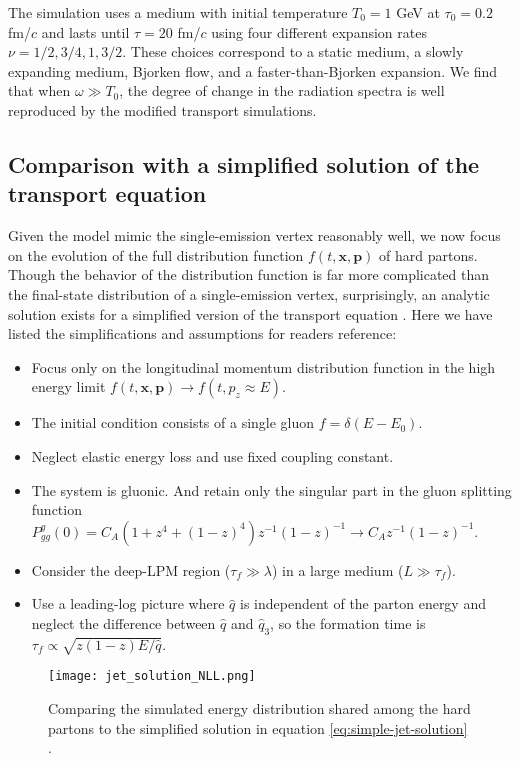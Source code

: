 The simulation uses a medium with initial temperature $T_0=1$ GeV at $\tau_0=0.2$ fm/$c$ and lasts until $\tau = 20$ fm/$c$ using four different expansion rates $\nu = 1/2, 3/4, 1, 3/2$.
These choices correspond to a static medium, a slowly expanding medium, Bjorken flow, and a faster-than-Bjorken expansion.
We find that when $\omega \gg T_0$, the degree of change in the radiation spectra is well reproduced by the modified transport simulations.

\subsection{Comparison with a simplified solution of the transport equation}
Given the model mimic the single-emission vertex reasonably well, we now focus on the evolution of the full distribution function $f(t, \mathbf{x}, \mathbf{p})$ of hard partons. 
Though the behavior of the distribution function is far more complicated than the final-state distribution of a single-emission vertex,
surprisingly, an analytic solution exists for a simplified version of the transport equation \cite{Blaizot:2013hx,Blaizot:2015jea}.
Here we have listed the simplifications and assumptions for readers reference:
\begin{itemize}
\item Focus only on the longitudinal momentum distribution function in the high energy limit $f(t, \mathbf{x}, \mathbf{p})\rightarrow f(t, p_z \approx E)$. 
\item The initial condition consists of a single gluon $f = \delta(E-E_0)$.
\item Neglect elastic energy loss and use fixed coupling constant.
\item The system is gluonic. And retain only the singular part in the gluon splitting function $P_{gg}^g(0) = C_A(1+z^4+(1-z)^4)z^{-1}(1-z)^{-1} \rightarrow C_A z^{-1}(1-z)^{-1}$.
\item Consider the deep-LPM region ($\tau_f \gg \lambda$) in a large medium ($L\gg \tau_f$).
\item Use a leading-log picture where $\hat{q}$ is independent of the parton energy and neglect the difference between $\hat{q}$ and $\hat{q}_3$, so the formation time is $\tau_f \propto \sqrt{z(1-z)E/\hat{q}}$.
\end{itemize}
\begin{figure}
\centering
\singlespacing
\texttt{[image: jet\_solution\_NLL.png]}
\caption[Comparing the simulated energy distribution shared among]{Comparing the simulated energy distribution shared among the hard partons to the simplified solution in equation \ref{eq:simple-jet-solution} \cite{Blaizot:2013hx}.}
\label{fig:jet_solution}
\end{figure}
